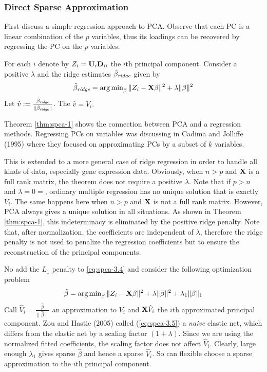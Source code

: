 \subsubsection{Direct Sparse Approximation}

First discuss a simple regression approach to PCA. Observe that each PC is a linear combination of the $p$ variables, thus its loadings can be recovered by regressing the PC on the $p$ variables. 
\begin{theorem}
	\label{thm:spca-1}
	For each $i$ denote by $Z_i = \mathbf{U}_i \mathbf{D}_{ii}$ the $i$th principal component. Consider a positive $\lambda$ and the ridge estimates $\hat{\beta}_{\emph{\text{ridge}}}$ given by 
	\begin{equation}
		\label{eq:spca-3.4}
		\hat{\beta}_{\emph{\text{ridge}}} = \operatorname{arg\,min}_\beta \|Z_i - \mathbf{X}\beta\|^2 + \lambda \|\beta\|^2
	\end{equation}
	Let $\hat{v} := \frac{\hat{\beta}_{\emph{\text{ridge}}}}{\|\hat{\beta}_{\emph{\text{ridge}}}\|}$. The $\hat{v} = V_i.$
\end{theorem}
Theorem \ref{thm:spca-1} shows the connection between PCA and a regression methods. Regressing PCs on variables was discussing in Cadima and Jolliffe (1995) where they focused on approximating PCs by a subset of $k$ variables. 

This is extended to a more general case of ridge regression in order to handle all kinds of data, especially gene expression data. Obviously, when $n > p$ and $\mathbf{X}$ is a full rank matrix, the theorem does not require a positive $\lambda$. Note that if $p > n$ and $\lambda = 0 =$, ordinary multiple regression has no unique solution that is exactly $V_i$. The same happens here when $n > p$ and $\mathbf{X}$ is not a full rank matrix. However,  PCA always gives a unique solution in all situations. As shown in Theorem \ref{thm:spca-1}, this indeterminacy is eliminated by the positive ridge penalty. Note that, after normalization, the coefficients are independent of $\lambda$, therefore the ridge penalty is not used to penalize the regression coefficients but to ensure the reconstruction of the principal components. 

No add the $L_1$ penalty to \ref{eq:spca-3.4} and consider the following optimization problem 
\begin{equation}
	\label{eq:spca-3.5}
	\hat{\beta} = \operatorname{arg\,min}_\beta \|Z_i - \mathbf{X}\beta\|^2 + \lambda \|\beta\|^2 + \lambda_1 \|\beta\|_1
\end{equation}
Call $\hat{V}_i = \frac{\hat{\beta}}{\|\hat{\beta}\|}$ an approximation to $V_i$ and $\mathbf{X} \hat{V}_i$ the $i$th approximated principal component. Zou and Hastie (2005) called (\ref{eq:spca-3.5}) a \emph{naive} elastic net, which differs from the elastic net by a scaling factor $(1 + \lambda)$. Since we are using the normalized fitted coefficients, the scaling factor does not affect $\hat{V}_i$. Clearly, large enough $\lambda_1$ gives sparse $\hat{\beta}$ and hence a sparse $\hat{V}_i$. So can flexible choose a sparse approximation to the $i$th principal component. 

